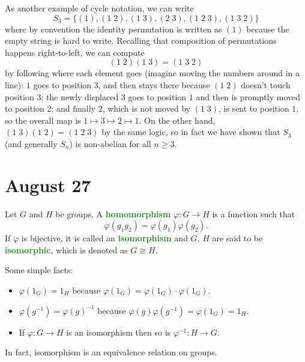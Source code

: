 \documentclass[11pt]{scrartcl}
\providecommand{\ii}{\item}
\providecommand{\inv}{^{-1}}
\providecommand{\vocab}[1]{{\textbf{\textcolor{ForestGreen}{#1}}}}
\begin{document}
As another example of cycle notation, we can write
\begin{equation*}
    S_3 = \{(1), (1\; 2), (1\; 3), (2\; 3), (1\; 2\; 3), (1\; 3\; 2)\}
\end{equation*}
where by convention the identity permutation is written as $(1)$
because the empty string is hard to write.
Recalling that composition of permutations happens right-to-left,
we can compute
\begin{equation*}
    (1\; 2)(1\; 3) = (1\; 3\; 2)
\end{equation*}
by following where each element goes (imagine moving the numbers around in a line):
$1$ goes to position $3$, and then stays there because $(1\; 2)$
doesn't touch position $3$; the newly displaced $3$ goes to position $1$
and then is promptly moved to position $2$; and finally $2$,
which is not moved by $(1\;3)$, is sent to position $1$,
so the overall map is $1\mapsto3\mapsto 2\mapsto1$.
On the other hand, $(1\;3)(1\;2) = (1\; 2\; 3)$ by the same logic,
so in fact we have shown that $S_3$
(and generally $S_n$)
is non-abelian for all $n\ge 3$.

\section{August 27}\label{sec:aug27}

\begin{definition}[Homomorphism]
    \label{def:homomorphism}
    Let $G$ and $H$ be groups. A \vocab{homomorphism} $\varphi\colon G\to H$
    is a function such that
    \begin{equation*}
        \varphi(g_1g_2) = \varphi(g_1)\varphi(g_2).
    \end{equation*}
    If $\varphi$ is bijective, it is called an \vocab{isomorphism}
    and $G$, $H$ are said to be \vocab{isomorphic},
    which is denoted as $G\cong H$.
\end{definition}

Some simple facts:
\begin{itemize}
    \ii $\varphi(1_G) = 1_H$ because $\varphi(1_G) = \varphi(1_G)\cdot\varphi(1_G)$.
    \ii $\varphi(g\inv) = \varphi(g)\inv$ because
    $\varphi(g)\varphi(g\inv) = \varphi(1_G) = 1_H$.
    \ii If $\varphi\colon G\to H$ is an isomorphism
    then so is $\varphi\inv\colon H\to G$.
\end{itemize}

In fact, isomorphism is an equivalence relation on groups.
\end{document}
